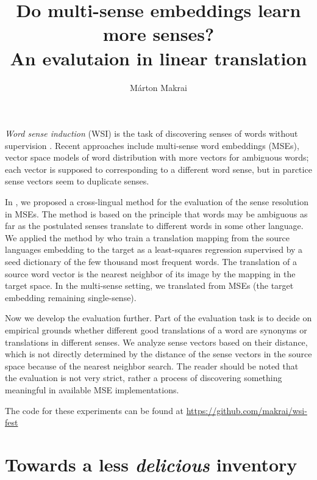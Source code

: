\documentclass[11pt]{article}
\title{Do multi-sense embeddings learn more senses? \\ An evalutaion in linear
translation}
\author{
  Márton Makrai
}
\date{}
\begin{document}
\maketitle



\emph{Word sense induction} (WSI) is the task of discovering senses of words
without supervision \citep{Schutze:1998}. Recent approaches include multi-sense
word embeddings (MSEs), vector space models of word distribution with more
vectors for ambiguous words; each vector is supposed to corresponding to a different
word sense, but in parctice sense vectors seem to duplicate senses.

In \cite{Borbely:2016}, we proposed a cross-lingual method for the evaluation
of the sense resolution in MSEs. The method is based on the principle that
words may be ambiguous as far as the postulated senses translate to different
words in some other language.  We applied the method by \citet{Mikolov:2013x}
who train a translation mapping from the source languages embedding to the
target as a least-squares regression supervised by a seed dictionary of the
few thousand most frequent words. The translation of a source word vector is
the nearest neighbor of its image by the mapping in the target space. In the
multi-sense setting, we translated from MSEs (the target embedding remaining
single-sense).

Now we develop the evaluation further. Part of the evaluation task is to decide
on empirical grounds whether different good translations of a word are synonyms
or translations in different senses.  We analyze sense vectors based on their
distance, which is not directly determined by the distance of the sense vectors
in the source space because of the nearest neighbor search. The reader should
be noted that the evaluation is not very strict, rather a process of
discovering something meaningful in available MSE implementations.

The code for these experiments can be found at
\url{https://github.com/makrai/wsi-fest}

\section{Towards a less \emph{delicious} inventory}
\end{document}
